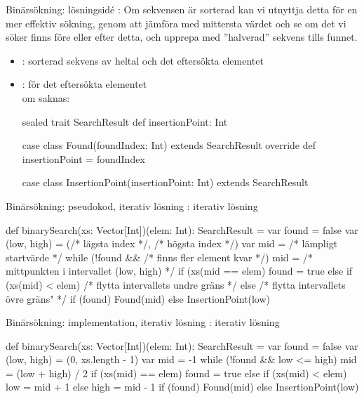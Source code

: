 \begin{Slide}{Binärsökning: lösningsidé}
: Om sekvensen är sorterad kan vi utnyttja detta för en mer effektiv sökning, genom att jämföra med mittersta värdet och se om det vi söker finns före eller efter detta, och upprepa med ''halverad'' sekvens tills funnet.
\pause
\begin{itemize}\SlideFontSmall
\item {}: sorterad sekvens av heltal och det eftersökta elementet
\item {}:  för det eftersökta elementet
\\ om saknas: 
\pause
\begin{Code}
sealed trait SearchResult {
  def insertionPoint: Int
}

case class Found(foundIndex: Int) extends SearchResult {
  override def insertionPoint = foundIndex
}
  
case class InsertionPoint(insertionPoint: Int) extends SearchResult
\end{Code}
\end{itemize} 
\end{Slide}

\begin{Slide}{Binärsökning: pseudokod, iterativ lösning}
: iterativ lösning
\begin{Code}
def binarySearch(xs: Vector[Int])(elem: Int): SearchResult = {
  var found = false
  var (low, high) = (/* lägsta index */, /* högsta index */)
  var mid = /* lämpligt startvärde */ 
  while (!found && /* finns fler element kvar */) {
    mid = /* mittpunkten i intervallet (low, high) */
    if (xs(mid == elem) found = true
    else if (xs(mid) < elem) /* flytta intervallets undre gräns */
    else /* flytta intervallets övre gräns" */
  }
  if (found) Found(mid)
  else InsertionPoint(low)
}
\end{Code}
\end{Slide}



\begin{Slide}{Binärsökning: implementation, iterativ lösning}
: iterativ lösning
\begin{Code}
def binarySearch(xs: Vector[Int])(elem: Int): SearchResult = {
  var found = false
  var (low, high) = (0, xs.length - 1)
  var mid = -1 
  while (!found && low <= high) {
    mid = (low + high) / 2
    if (xs(mid) == elem) found = true
    else if (xs(mid) < elem) low = mid + 1
    else high = mid - 1 
  }
  if (found) Found(mid)
  else InsertionPoint(low)
}
\end{Code}
\end{Slide}

